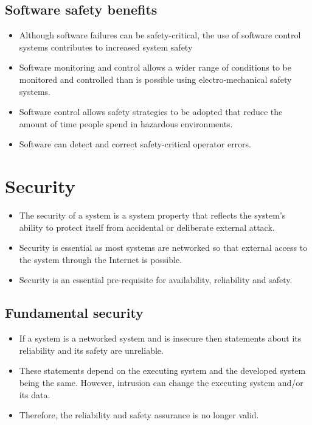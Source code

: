 \subsection{Software safety benefits}
\begin{itemize}
\item Although software failures can be safety-critical, the use of software control systems contributes to increased system safety

  \item Software monitoring and control allows a wider range of conditions to be monitored and controlled than is possible using electro-mechanical safety systems.
  \item Software control allows safety strategies to be adopted that reduce the amount of time people spend in hazardous environments.
  \item Software can detect and correct safety-critical operator errors.

\end{itemize}
\section{Security}
\begin{itemize}
\item The security of a system is a system property that reflects the system’s ability to protect itself from accidental or deliberate external attack.

\item Security is essential as most systems are networked so that external access to the system through the Internet is possible.

\item Security is an essential pre-requisite for availability, reliability and safety.


\end{itemize}
\subsection{Fundamental security}
\begin{itemize}
\item If a system is a networked system and is insecure then statements about its reliability and its safety are unreliable.

\item These statements depend on the executing system and the developed system being the same. However, intrusion can change the executing system and/or its data.

\item Therefore, the reliability and safety assurance is no longer valid.

\end{itemize}
\newpage
